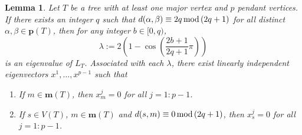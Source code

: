 \documentclass[preprint,12pt]{elsarticle}
\newcommand{\1}{\mathbf{1}}
\newcommand{\0}{\mathbf{0}}
\def\m{\mathbf{m}}
\def\pt{\mathbf{p}}
\newtheorem{lemma}{Lemma}
\begin{document}
\begin{lemma}\label{sufficient}
Let $T$ be a tree with at least one major vertex and $p$ pendant vertices.
If there exists an integer $q$ such that
$d(\alpha,\beta)\equiv 2q\,{\rm{mod}}\,(2q+1)$ for all distinct $\alpha,\beta \in \pt(T)$, then
for any integer $b\in[0,q)$, 
$$\lambda:=2\left(1-\cos \left(\frac{2b+1}{2q+1}\pi\right) \right)$$
is an eigenvalue of $L_T$. Associated with each $\lambda$, there exist 
linearly 
independent eigenvectors $x^1,\dots,x^{p-1}$ such that
\begin{enumerate}
    \item[{\rm{(a)}}] If $m \in \m(T)$, then $x^{j}_m=0$ for all $j=1:p-1$.
     \item[{\rm{(b)}}] If $s \in V(T)$, $m \in \m(T)$ and $d(s,m) \equiv 0\,{\rm{mod}}\,(2q+1)$, then $x^j_s=0$ for all $j=1:p-1$.
\end{enumerate}
\end{lemma}
\end{document}
